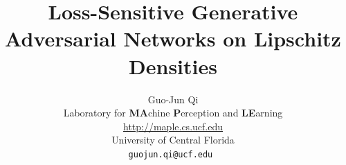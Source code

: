 \newcommand{\theHalgorithm}{\arabic{algorithm}}
\newtheorem{theorem}{Theorem}
\newtheorem{lemma}{Lemma}
\newtheorem{assumption}{Assumption}
\newtheorem{corollary}{Corollary}
\newtheorem{remark}{Remark}
\newcommand{\1}[1]{\mathds{1}_{\left[#1\right]}}

\usepackage{CJK}
\usepackage{indentfirst}
\usepackage[colorlinks,linkcolor=red,anchorcolor=blue,citecolor=green]{hyperref}
\usepackage{fancyhdr}
\pagestyle{fancy}
\fancyhf{}
\fancyfoot[C]{\thepage}
\renewcommand{\headrulewidth}{0.6pt}
%
%
%
%
%


\title{Loss-Sensitive Generative Adversarial Networks on Lipschitz Densities%
}


\author{Guo-Jun Qi \\
Laboratory for {\bf MA}chine {\bf P}erception and {\bf LE}arning \\
\url{http://maple.cs.ucf.edu}\\
University of Central Florida\\
\tt\small guojun.qi@ucf.edu          %
}




